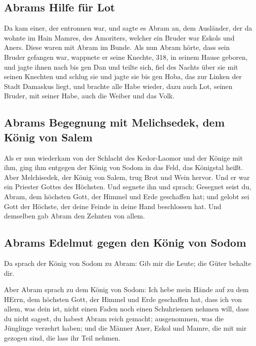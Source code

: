 \hypertarget{abrams-hilfe-fuxfcr-lot}{%
\subsection{Abrams Hilfe für Lot}\label{abrams-hilfe-fuxfcr-lot}}

 Da kam einer, der entronnen war, und sagte es Abram an,
dem Ausländer, der da wohnte im Hain Mamres, des Amoriters, welcher ein
Bruder war Eskols und Aners. Diese waren mit Abram im Bunde.
 Als nun Abram hörte, dass sein Bruder gefangen war,
wappnete er seine Knechte, 318, in seinem Hause geboren, und jagte ihnen
nach bis gen Dan  und teilte sich, fiel des Nachts über
sie mit seinen Knechten und schlug sie und jagte sie bis gen Hoba, das
zur Linken der Stadt Damaskus liegt,  und brachte alle
Habe wieder, dazu auch Lot, seinen Bruder, mit seiner Habe, auch die
Weiber und das Volk.

\hypertarget{abrams-begegnung-mit-melichsedek-dem-kuxf6nig-von-salem}{%
\subsection{Abrams Begegnung mit Melichsedek, dem König von
Salem}\label{abrams-begegnung-mit-melichsedek-dem-kuxf6nig-von-salem}}

 Als er nun wiederkam von der Schlacht des Kedor-Laomor
und der Könige mit ihm, ging ihm entgegen der König von Sodom in das
Feld, das Königstal heißt.  Aber Melchisedek, der König
von Salem, trug Brot und Wein hervor. Und er war ein Priester Gottes des
Höchsten.  Und segnete ihn und sprach: Gesegnet seist du,
Abram, dem höchsten Gott, der Himmel und Erde geschaffen hat;
 und gelobt sei Gott der Höchste, der deine Feinde in
deine Hand beschlossen hat. Und demselben gab Abram den Zehnten von
allem.

\hypertarget{abrams-edelmut-gegen-den-kuxf6nig-von-sodom}{%
\subsection{Abrams Edelmut gegen den König von
Sodom}\label{abrams-edelmut-gegen-den-kuxf6nig-von-sodom}}

 Da sprach der König von Sodom zu Abram: Gib mir die
Leute; die Güter behalte dir.

 Aber Abram sprach zu dem König von Sodom: Ich hebe mein
Hände auf zu dem HErrn, dem höchsten Gott, der Himmel und Erde
geschaffen hat,  dass ich von allem, was dein ist, nicht
einen Faden noch einen Schuhriemen nehmen will, dass du nicht sagest, du
habest Abram reich gemacht;  ausgenommen, was die
Jünglinge verzehrt haben; und die Männer Aner, Eskol und Mamre, die mit
mir gezogen sind, die lass ihr Teil nehmen.

